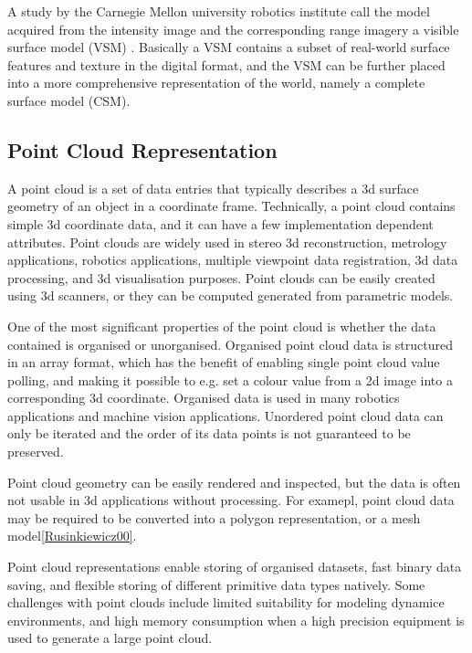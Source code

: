 \documentclass[12pt,a4paper,oneside,pdftex]{report}
\begin{document}
A study by the Carnegie Mellon university robotics institute call the model acquired from the intensity image and the corresponding range imagery a visible surface model (VSM) \cite{Rander97}. Basically a VSM contains a subset of real-world surface features and texture in the digital format, and the VSM can be further placed into a more comprehensive representation of the world, namely a complete surface model (CSM). 

\subsection{Point Cloud Representation}
\label{subsection:point_cloud_representation}

A point cloud is a set of data entries that typically describes a 3d surface geometry of an object in a coordinate frame. Technically, a point cloud contains simple 3d coordinate data, and it can have a few implementation dependent attributes. Point clouds are widely used in stereo 3d reconstruction, metrology applications, robotics applications, multiple viewpoint data registration, 3d data processing, and 3d visualisation purposes. Point clouds can be easily created using 3d scanners, or they can be computed generated from parametric models.

One of the most significant properties of the point cloud is whether the data contained is organised or unorganised. Organised point cloud data is structured in an array format, which has the benefit of enabling single point cloud value polling, and making it possible to e.g. set a colour value from a 2d image into a corresponding 3d coordinate. Organised data is used in many robotics applications and machine vision applications. Unordered point cloud data can only be iterated and the order of its data points is not guaranteed to be preserved.

Point cloud geometry can be easily rendered and inspected, but the data is often not usable in 3d applications without processing. For examepl, point cloud data may be required to be converted into a polygon representation, or a mesh model\ref{Rusinkiewicz00}.

Point cloud representations enable storing of organised datasets, fast binary data saving, and flexible storing of different primitive data types natively. Some challenges with point clouds include limited suitability for modeling dynamice environments, and high memory consumption when a high precision equipment is used to generate a large point cloud\citep{PCDFormat14, Hornung10}.
\end{document}
